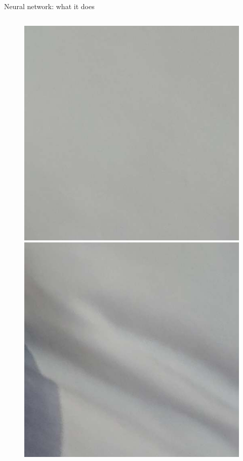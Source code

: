 \documentclass{beamer}
\begin{document}
\begin{frame}{Neural network: what it does}
\begin{columns}
\begin{column}{0.05\textwidth}
\begin{figure}
                \includegraphics[width=\linewidth]{distorted/distorted-3-1}
                \includegraphics[width=\linewidth]{distorted/distorted-3-2}

\end{figure}
\end{column}
\end{columns}
\end{frame}
\end{document}
